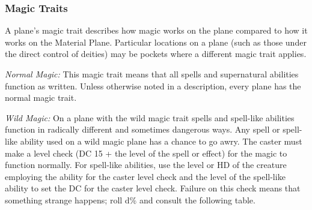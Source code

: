 \subsubsection{Magic Traits}

A plane's magic trait describes how magic works on the plane compared to how it 
works on the Material Plane. Particular locations on a plane (such as those under 
the direct control of deities) may be pockets where a different magic trait applies.

\textit{Normal Magic:} This magic trait means that all spells and supernatural 
abilities function as written. Unless otherwise noted in a description, every plane 
has the normal magic trait.

\textit{Wild Magic:} On a plane with the wild magic trait spells and spell-like 
abilities function in radically different and sometimes dangerous ways. Any spell 
or spell-like ability used on a wild magic plane has a chance to go awry. The caster 
must make a level check (DC 15 + the level of the spell or effect) for the magic 
to function normally. For spell-like abilities, use the level or HD of the creature 
employing the ability for the caster level check and the level of the spell-like 
ability to set the DC for the caster level check. Failure on this check means that 
something strange happens; roll d\% and consult the following table.

